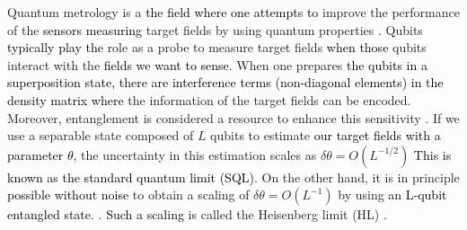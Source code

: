 \documentclass[prl,twocolumn,superscriptaddress]{revtex4}
\begin{document}
\maketitle
Quantum metrology is a \textcolor{black}{the field where one attempts to}
improve the performance of the \textcolor{black}{sensors measuring}
target fields
by using quantum properties
\cite{budker2007optical,balasubramanian2008nanoscaleetal,maze2008nanoscaleetal,toth2014quantum,degen2016quantum,degen2017quantum}.
Qubits \textcolor{black}{typically play the}
role as a probe to measure target fields
\textcolor{black}{when those}
qubits interact with the \textcolor{black}{fields we want to sense}.
When one prepares
\textcolor{black}{the qubits in a superposition state,}
\textcolor{black}{there are interference terms (non-diagonal elements) in the density matrix where }
the information of the target fields can be encoded.
Moreover, entanglement is considered a
resource to enhance this sensitivity \cite{wineland1992dj,
leibfried2004toward, giovannetti2004quantum,
giovannetti2006quantum,giovannetti2011advances,pirandola2017ultimate}.
If we use a separable state composed
of $L$ qubits to estimate
\textcolor{black}{our target fields with a parameter $\theta $,}
the uncertainty in this
estimation scales as $\delta \theta =O (L^{-1/2})$
\textcolor{black}{This is known as the standard quantum
limit (SQL).}
On the other
hand, it is in principle \textcolor{black}{possible without noise} to obtain a scaling of $\delta \theta =O
(L^{-1})$ by using  \textcolor{black}{an L-qubit entangled state}.
\cite{huelga1997improvement}.
\textcolor{black}{Such a scaling}
is
called the Heisenberg limit (HL) \cite{giovannetti2004quantum, giovannetti2006quantum,giovannetti2011advances}.
\end{document}
